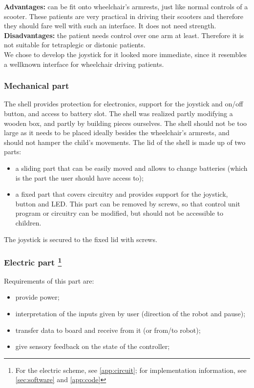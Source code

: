 \documentclass[a4paper,twoside]{book}
\begin{document}
\textbf{Advantages:} can be fit onto wheelchair's armrests, just like normal controls of a scooter. These patients are very practical in driving their scooters and therefore they should fare well with such an interface. It does not need strength.
\\

\textbf{Disadvantages:} the patient needs control over one arm at least. Therefore it is not suitable for tetraplegic or distonic patients.
\\

We chose to develop the joystick for it looked more immediate, since it resembles a well\textendash known interface for wheelchair driving patients.
\\
\subsubsection{Mechanical part}

The shell provides protection for electronics, support for the joystick and on/off button, and access to battery slot. The shell was realized partly modifying a wooden box, and partly by building pieces ourselves. The shell should not be too large as it needs to be placed ideally besides the wheelchair's armrests, and should not hamper the child's movements.
The lid of the shell is made up of two parts:

\begin{itemize}
\item a sliding part that can be easily moved and allows to change batteries (which is the part the user should have access to);
\item a fixed part that covers circuitry and provides support for the joystick, button and LED. This part can be removed by screws, so that control unit program or circuitry can be modified, but should not be accessible to children.
\end{itemize}

The joystick is secured to the fixed lid with screws.

\subsubsection[Electric part]{Electric part \footnote{For the electric scheme, see \autoref{app:circuit}; for implementation information, see \autoref{sec:software} and \autoref{app:code}}}
Requirements of this part are: 
\begin{itemize}
\item provide power;
\item interpretation of the inputs given by user (direction of the robot and pause);
\item transfer data to board and receive from it (or from/to robot);
\item give sensory feedback on the state of the controller;
\end{itemize}
\end{document}
